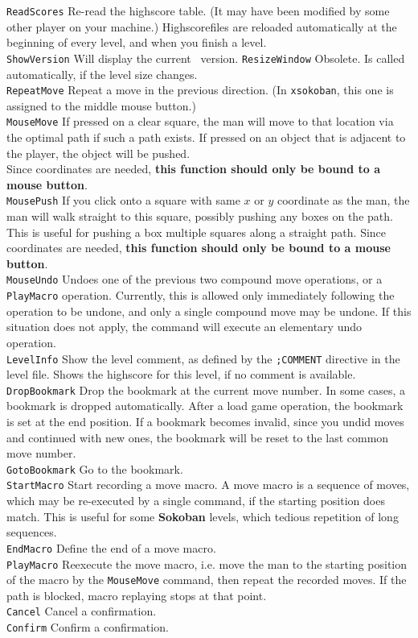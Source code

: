 {\tt ReadScores} Re-read the highscore table. (It may have been modified by
some other player on your machine.) Highscorefiles are reloaded automatically
at the beginning of every level, and when you finish a level.\\
{\tt ShowVersion} Will display the current \xsok\ version.
{\tt ResizeWindow} Obsolete. Is called automatically, if the level size
changes.\\
{\tt RepeatMove} Repeat a move in the previous direction. (In {\tt xsokoban},
this one is assigned to the middle mouse button.)\\
{\tt MouseMove} If pressed on a clear square, the man will move to
that location via the optimal path if such a path exists. If pressed on an
object that is adjacent to the player, the object will be pushed.\\
Since coordinates are needed, {\bf this function should only be bound to a
mouse button}.\\
{\tt MousePush} If you click onto a square with same $x$ or $y$ coordinate as
the man, the man will walk straight to this square, possibly pushing any
boxes on the path. This is useful for pushing a box multiple squares along
a straight path.
Since coordinates are needed, {\bf this function should only be bound to a
mouse button}.\\
{\tt MouseUndo} Undoes one of the previous two compound move operations, or a
{\tt PlayMacro} operation.
Currently, this is allowed only immediately following the operation to be
undone, and only a single compound move may be undone. If this situation
does not apply, the command will execute an elementary undo operation.\\
{\tt LevelInfo} Show the level comment, as defined by the {\tt ;COMMENT}
directive in the level file. Shows the highscore for this level, if no comment
is available.\\
{\tt DropBookmark} Drop the bookmark at the current move number. In some cases,
a bookmark is dropped automatically. After a load game operation, the bookmark
is set at the end position. If a bookmark becomes invalid, since you undid
moves and continued with new ones, the bookmark will be reset to the last
common move number.\\
{\tt GotoBookmark} Go to the bookmark.\\
{\tt StartMacro} Start recording a move macro. A move macro is a sequence of
moves, which may be re-executed by a single command, if the starting position
does match. This is useful for some {\bf Sokoban} levels, which tedious
repetition of long sequences.\\
{\tt EndMacro} Define the end of a move macro.\\
{\tt PlayMacro} Reexecute the move macro, i.e. move the man to the starting
position of the macro by the {\tt MouseMove} command, then repeat the recorded
moves. If the path is blocked, macro replaying stops at that point.\\
{\tt Cancel} Cancel a confirmation.\\
{\tt Confirm} Confirm a confirmation.\\

